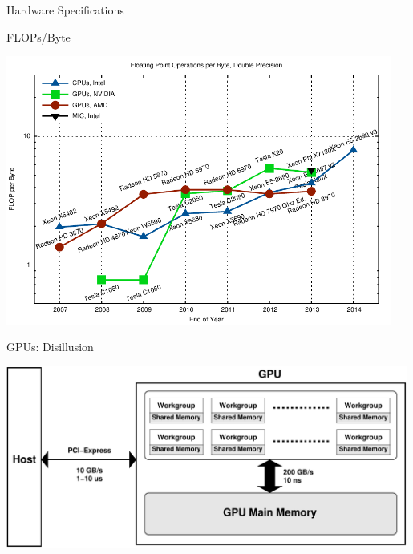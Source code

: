 \begin{frame}{Hardware Specifications}
 \begin{block}{FLOPs/Byte} \end{block}
 \begin{center} \vspace*{-0.9cm} \includegraphics[width=0.95\textwidth]{figures/flop-per-byte-dp} \end{center}
\end{frame}

\begin{frame}{GPUs: Disillusion}
 \begin{center} \includegraphics[width=0.99\textwidth]{figures/gpu-schematic} \end{center}
\end{frame}

